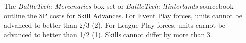 The \emph{BattleTech: Mercenaries} box set or \emph{BattleTech: Hinterlands} sourcebook outline the SP costs for Skill Advances.
For Event Play forces, units cannot be advanced to better than 2/3 (2).
For League Play forces, units cannot be advanced to better than 1/2 (1).
Skills cannot differ by more than 3.
